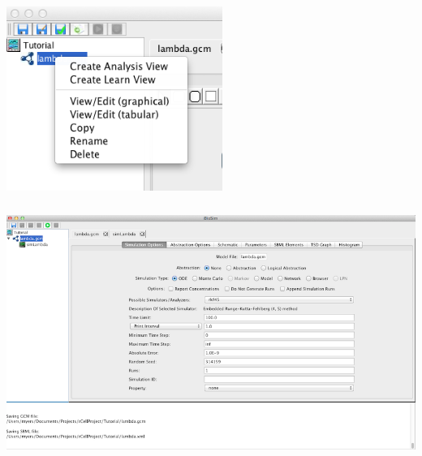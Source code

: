 \documentclass[titlepage,11pt]{article}
\begin{document}
\begin{center}
\includegraphics[height=60mm]{screenshots/GCMAnalysis}\\
\includegraphics[height=90mm]{screenshots/analysisView}
\end{center}
\end{document}
